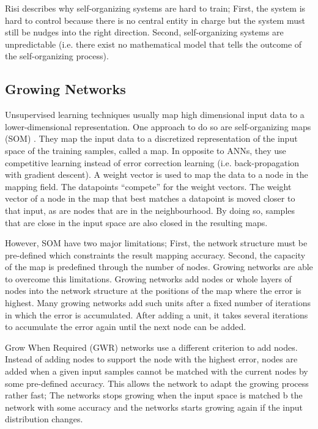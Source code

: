 Risi  describes why self-organizing systems are hard to train;
First, the system is hard to control because there is no central entity in charge but the system must still be nudges into the right direction.
Second, self-organizing systems are unpredictable (i.e. there exist no mathematical model that tells the outcome of the self-organizing process).

\subsection{Growing Networks}
Unsupervised learning techniques usually map high dimensional input data to a lower-dimensional representation.
One approach to do so are self-organizing maps (SOM) .
They map the input data to a discretized representation of the input space of the training samples, called a map.
In opposite to ANNs, they use competitive learning instead of error correction learning (i.e. back-propagation with gradient descent).
A weight vector is used to map the data to a node in the mapping field.
The datapoints ``compete'' for the weight vectors.
The weight vector of a node in the map that best matches a datapoint is moved closer to that input, as are nodes that are in the neighbourhood.
By doing so, samples that are close in the input space are also closed in the resulting maps.

However, SOM have two major limitations; First, the network structure must be pre-defined which constraints the result mapping accuracy. Second, the capacity of the map is predefined through the number of nodes.
Growing networks are able to overcome this limitations.
Growing networks add nodes or whole layers of nodes into the network structure at the positions of the map where the error is highest.
Many growing networks  add such units after a fixed number of iterations in which the error is accumulated.
After adding a unit, it takes several iterations to accumulate the error again until the next node can be added.

Grow When Required (GWR) networks  use a different criterion to add nodes.
Instead of adding nodes to support the node with the highest error, nodes are added when a given input samples cannot be matched with the current nodes by some pre-defined accuracy.
This allows the network to adapt the growing process rather fast; The networks stops growing when the input space is matched b the network with some accuracy and the networks starts growing again if the input distribution changes.

